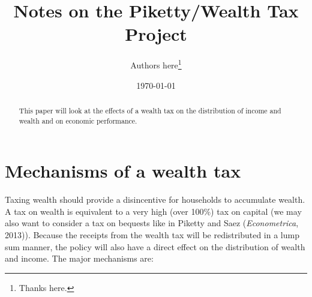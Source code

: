 \documentclass[article,11pt,letterpaper,fleqn]{article}
\author{Authors here\thanks{Thanks here.}}
\title{Notes on the Piketty/Wealth Tax Project}
\date{\today}
\theoremstyle{definition}
\numberwithin{equation}{section}
\begin{document}

\maketitle



\begin{abstract}
This paper will look at the effects of a wealth tax on the distribution of income and wealth and on economic performance.
\end{abstract}



\section{Mechanisms of a wealth tax}
\label{sec:mechanics}

Taxing wealth should provide a disincentive for households to accumulate wealth.  A tax on wealth is equivalent to a very high (over 100\%) tax on capital (we may also want to consider a tax on bequests like in Piketty and Saez (\emph{Econometrica}, 2013)). Because the receipts from the wealth tax will be redistributed in a lump sum manner, the policy will also have a direct effect on the distribution of wealth and income.  The major mechanisms are:
\end{document}
